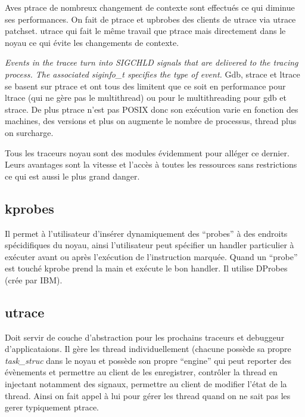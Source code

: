 \documentclass{article}
\begin{document}
Aves ptrace de nombreux changement de contexte sont effectués ce qui
diminue ses performances. On fait de ptrace et upbrobes des clients de
utrace via utrace patchset. utrace qui fait le même travail que ptrace
mais directement dans le noyau ce qui évite les changements de
contexte.

\textit{Events in the tracee turn into SIGCHLD signals that are
  delivered to the tracing process. The associated siginfo\_t
  specifies the type of event.}  Gdb, strace et ltrace se basent sur
ptrace et ont tous des limitent que ce soit en performance pour ltrace
(qui ne gère pas le multithread) ou pour le multithreading pour gdb et
strace. De plus ptrace n'est pas POSIX donc son exécution varie en
fonction des machines, des versions et plus on augmente le nombre de
processus, thread plus on surcharge.

Tous les traceurs noyau sont des modules évidemment pour alléger ce
dernier. Leurs avantages sont la vitesse et l'accès à toutes les
ressources sans restrictions ce qui est aussi le plus grand danger.

\subsection{kprobes}
Il permet à l'utilisateur d'insérer dynamiquement des ``probes'' à des
endroits spécidifiques du noyau, ainsi l'utilisateur peut spécifier un
handler particulier à exécuter avant ou après l'exécution de
l'instruction marquée. Quand un ``probe'' est touché kprobe prend la
main et exécute le bon handler. Il utilise DProbes (crée par IBM).

\subsection{utrace}
Doit servir de couche d'abstraction pour les prochains traceurs et
debuggeur d'applicataions. Il gère les thread individuellement
(chacune possède sa propre \textit{task\_struc} dans le noyau et
possède son propre ``engine'' qui peut reporter des évènements et
permettre au client de les enregistrer, contrôler la thread en
injectant notamment des signaux, permettre au client de modifier
l'état de la thread. Ainsi on fait appel à lui pour gérer les thread
quand on ne sait pas les gerer typiquement ptrace.
\end{document}
